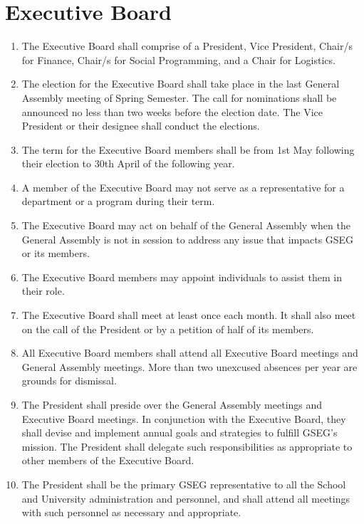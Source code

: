 \chapter{Executive Board}
\label{art:exec}

\begin{enumerate}[label=\Alph*.]

\item The Executive Board shall comprise of a President, Vice President, Chair/s for Finance, 
Chair/s for Social Programming, and a Chair for Logistics.
\item The election for the Executive Board shall take place in the last General Assembly meeting of Spring Semester. The call for nominations shall be announced no less than two weeks before the
election date. The Vice President or their designee shall conduct the elections.
\item The term for the Executive Board members shall be from 1st May following their election to
30th April of the following year.  
\item A member of the Executive Board may not serve as a representative for a department or a
program during their term.
\item The Executive Board may act on behalf of the General Assembly when the General Assembly is
not in session to address any issue that impacts GSEG or its members.
\item The Executive Board members may appoint individuals to assist them in their role.

\item The Executive Board shall meet at least once each month. It shall also meet on the call
of the President or by a petition of half of its members. 

\item All Executive Board members shall attend all Executive Board meetings and General Assembly
meetings. More than two unexcused absences per year are grounds for dismissal.

\item The President shall preside over the General Assembly meetings and Executive Board meetings. In conjunction with the Executive Board, they shall devise and implement annual goals and strategies to fulfill GSEG's mission. The President shall delegate such responsibilities as appropriate to other members of the Executive Board. 

\item The President shall be the primary GSEG representative to all the School and University administration and personnel, and shall attend all meetings with such personnel as necessary and appropriate.


\end{enumerate}
